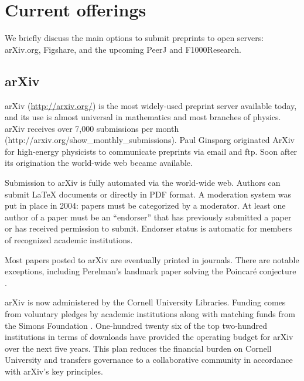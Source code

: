 \documentclass[letterpaper,twocolumn,superscriptaddress,showkeys]{revtex4}
\begin{document}
\section{Current offerings}

We briefly discuss the main options to submit preprints to open servers:
arXiv.org, Figshare, and the upcoming PeerJ and F1000Research.

\subsection{arXiv}

%

arXiv (\href{http://arxiv.org/}{http://arxiv.org/}) is the most
widely-used preprint server available today, and its use is almost
universal in mathematics and most branches of physics.  arXiv receives
over 7,000 submissions per month
(http://arxiv.org/show_monthly_submissions).  Paul Ginsparg originated
ArXiv for high-energy physicists to communicate preprints via email
and ftp.  Soon after its origination the world-wide web became
available.

Submission to arXiv is fully automated via the world-wide web.
Authors can submit LaTeX documents or directly in PDF format.  A
moderation system was put in place in 2004: papers must be categorized
by a moderator.  At least one author of a paper must be an
``endorser'' that has previously submitted a paper or has received
permission to submit.  Endorser status is automatic for members of
recognized academic institutions.

Most papers posted to arXiv are eventually printed in journals.  There
are notable exceptions, including Perelman's landmark paper solving
the Poincar\'{e} conjecture \cite{2002math.....11159P}.

arXiv is now administered by the Cornell University Libraries.
Funding comes from voluntary pledges by academic institutions along
with matching funds from the Simons Foundation \cite{arxiv_future}.
One-hundred twenty six of the top two-hundred institutions in terms of
downloads have provided the operating budget for arXiv over the next
five years.  This plan reduces the financial burden on Cornell
University and transfers governance to a collaborative community in
accordance with arXiv's key principles.
\end{document}
